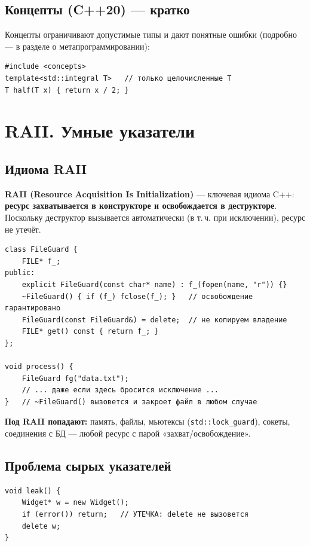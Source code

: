 \subsection{Концепты (C++20) --- кратко}

Концепты ограничивают допустимые типы и дают понятные ошибки (подробно --- в
разделе о метапрограммировании):

\begin{lstlisting}
#include <concepts>
template<std::integral T>   // только целочисленные T
T half(T x) { return x / 2; }
\end{lstlisting}


\section{RAII. Умные указатели}

\subsection{Идиома RAII}

\textbf{RAII (Resource Acquisition Is Initialization)} --- ключевая идиома C++:
\textbf{ресурс захватывается в конструкторе и освобождается в деструкторе}.
Поскольку деструктор вызывается автоматически (в т.\,ч. при исключении), ресурс
не утечёт.

\begin{lstlisting}
class FileGuard {
    FILE* f_;
public:
    explicit FileGuard(const char* name) : f_(fopen(name, "r")) {}
    ~FileGuard() { if (f_) fclose(f_); }   // освобождение гарантировано
    FileGuard(const FileGuard&) = delete;  // не копируем владение
    FILE* get() const { return f_; }
};

void process() {
    FileGuard fg("data.txt");
    // ... даже если здесь бросится исключение ...
}   // ~FileGuard() вызовется и закроет файл в любом случае
\end{lstlisting}

\textbf{Под RAII попадают:} память, файлы, мьютексы (\texttt{std::lock\_guard}),
сокеты, соединения с БД --- любой ресурс с парой «захват/освобождение».

\subsection{Проблема сырых указателей}

\begin{lstlisting}
void leak() {
    Widget* w = new Widget();
    if (error()) return;   // УТЕЧКА: delete не вызовется
    delete w;
}
\end{lstlisting}

